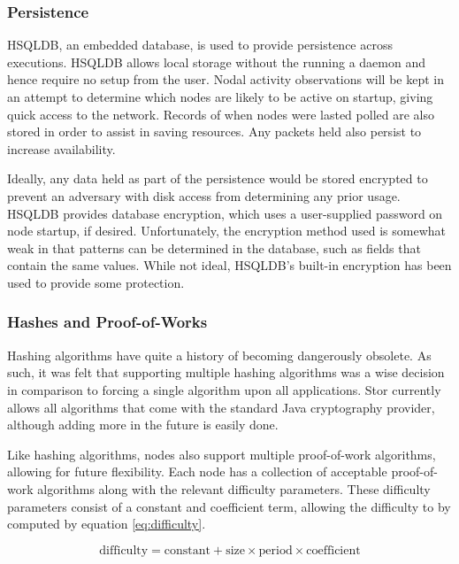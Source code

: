 	
		\subsubsection*{Persistence}
			HSQLDB, an embedded database, is used to provide persistence across executions. HSQLDB allows local storage without the running a daemon and hence require no setup from the user. Nodal activity observations will be kept in an attempt to determine which nodes are likely to be active on startup, giving quick access to the network. Records of when nodes were lasted polled are also stored in order to assist in saving resources. Any packets held also persist to increase availability.
			
			Ideally, any data held as part of the persistence would be stored encrypted to prevent an adversary with disk access from determining any prior usage. HSQLDB provides database encryption, which uses a user-supplied password on node startup, if desired. Unfortunately, the encryption method used is somewhat weak in that patterns can be determined in the database, such as fields that contain the same values. While not ideal, HSQLDB's built-in encryption has been used to provide some protection.
		\subsubsection*{Hashes and Proof-of-Works}
			Hashing algorithms have quite a history of becoming dangerously obsolete. As such, it was felt that supporting multiple hashing algorithms was a wise decision in comparison to forcing a single algorithm upon all applications. Stor currently allows all algorithms that come with the standard Java cryptography provider, although adding more in the future is easily done. 
		
			Like hashing algorithms, nodes also support multiple proof-of-work algorithms, allowing for future flexibility. Each node has a collection of acceptable proof-of-work algorithms along with the relevant difficulty parameters. These difficulty parameters consist of a constant and coefficient term, allowing the difficulty to by computed by equation \ref{eq:difficulty}. 
		
			\begin{equation} \label{eq:difficulty}
			\text{difficulty} = \text{constant} + \text{size} \times \text{period} \times \text{coefficient}
			\end{equation}
			
